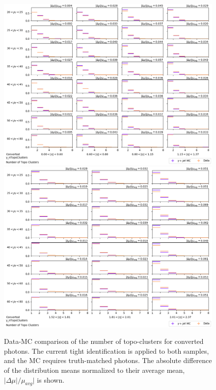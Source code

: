\begin{figure}[!thp]
    \centering
    \includegraphics[width=.74\textwidth]{appendices/datamc_images/y_nTopoClusters_Converted_lowerEta.png}
    \includegraphics[width=.74\textwidth]{appendices/datamc_images/y_nTopoClusters_Converted_upperEta.png}
    \caption[Data-MC comparison of the number of topo-clusters for converted photons]{Data-MC comparison of the number of topo-clusters for converted photons. The current tight identification is applied to both samples, and the \gls{MC} requires truth-matched photons. The absolute difference of the distribution means normalized to their average mean, $|\Delta \mu|/\mu_{avg}|$ is shown.}
    \label{fig:dmc-c-ntopo}
\end{figure}
